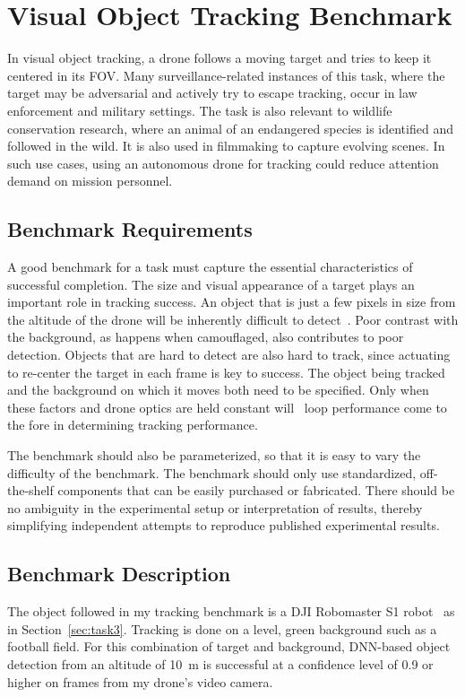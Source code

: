 \section{Visual Object Tracking Benchmark}
\label{sec:tracking}
In visual object tracking, a drone follows a moving target and tries
to keep it centered in its FOV.  Many surveillance-related instances
of this task, where the target may be adversarial and actively try to
escape tracking, occur in law enforcement and military settings.  The
task is also relevant to wildlife conservation research, where an
animal of an endangered species is identified and followed in the
wild.  It is also used in filmmaking to capture evolving scenes.  In
such use cases, using an autonomous drone for tracking could reduce
attention demand on mission personnel.

\subsection{Benchmark Requirements}
\label{sec:tracking-requirements}

A good benchmark for a task must capture the essential characteristics of successful completion. The size and visual appearance of a target plays an important role in
tracking success.  An object that is just a few pixels in size from
the altitude of the drone will be inherently difficult to
detect~\cite{Huang2017}.  Poor contrast with the background, as
happens when camouflaged, also contributes to poor detection.  Objects
that are hard to detect are also hard to track, since actuating to
re-center the target in each frame is key to success.  The object
being tracked and the background on which it moves both need to be
specified.  Only when these factors and drone optics are held
constant will \ooda~loop performance come to the fore in determining
tracking performance.

The benchmark should also be parameterized, so that it is easy to
vary the difficulty of the benchmark.  The benchmark should only use
standardized, off-the-shelf components that can be easily purchased or
fabricated.  There should be no ambiguity in the experimental setup or
interpretation of results, thereby simplifying independent attempts to
reproduce published experimental results.

\subsection{Benchmark Description}
\label{sec:tracking-description}
The object followed in my tracking benchmark is a DJI Robomaster S1
robot~\cite{Robomaster2022} as in Section~\ref{sec:task3}.  Tracking is done on a level, green background such as a football field.  For this combination of target and background, DNN-based object detection from an altitude of 10~m is successful at a confidence level of 0.9 or higher on frames from my drone's video camera.

